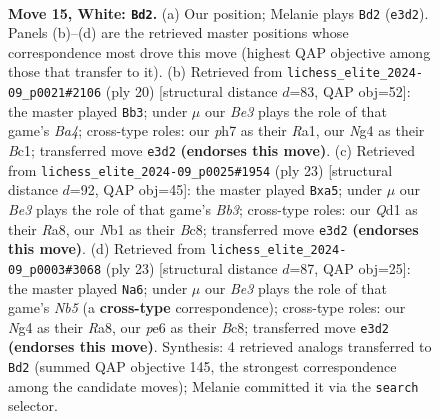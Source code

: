 \documentclass[11pt]{article}
\begin{document}
\clearpage

\begin{figure}[p]\centering
\begin{subfigure}{0.46\textwidth}\centering
\resizebox{\linewidth}{!}{%
\newchessgame
\chessboard[
  setfen={rnbr2k1/1p2bppp/pn1qp3/8/2pp2N1/1P2B1P1/P3PPBP/RN1QRK2 w - - 0 15},
  showmover=false,
  pgfstyle=straightmove, color=movearrow, markmove={e3-d2}
]}
\caption{}
\end{subfigure}\hfill
\begin{subfigure}{0.46\textwidth}\centering
\resizebox{\linewidth}{!}{%
\newchessgame
\chessboard[
  setfen={r1bqrbk1/2pp1pp1/p1n2n1p/1p2p3/B3P3/2PP1NN1/PP3PPP/R1BQ1RK1 w - - 0 11},
  showmover=false,
  pgfstyle=straightmove, color=movearrow, markmove={a4-b3}
]}
\caption{}
\end{subfigure}
\\[4pt]
\begin{subfigure}{0.46\textwidth}\centering
\resizebox{\linewidth}{!}{%
\newchessgame
\chessboard[
  setfen={r1bq1rk1/1p3ppp/1bpp1nn1/P3p3/4P3/1BPP1N2/P4PPP/R1BQRNK1 b - - 0 12},
  showmover=false,
  pgfstyle=straightmove, color=movearrow, markmove={b6-a5}
]}
\caption{}
\end{subfigure}\hfill
\begin{subfigure}{0.46\textwidth}\centering
\resizebox{\linewidth}{!}{%
\newchessgame
\chessboard[
  setfen={r1bq1rk1/2ppnpbp/6p1/pp1P4/1n2P3/PB3N2/1P3PPP/RNBQ1RK1 b - - 0 12},
  showmover=false,
  pgfstyle=straightmove, color=movearrow, markmove={b4-a6}
]}
\caption{}
\end{subfigure}
\caption{\textbf{Move 15, White: \texttt{Bd2}.} (a) Our position; Melanie plays \texttt{Bd2} (\texttt{e3d2}). Panels (b)--(d) are the retrieved master positions whose correspondence most drove this move (highest QAP objective among those that transfer to it). (b) Retrieved from \texttt{lichess\_elite\_2024-09\_p0021\#2106} (ply 20) [structural distance $d$=83, QAP obj=52]: the master played \texttt{Bb3}; under $\mu$ our \emph{Be3} plays the role of that game's \emph{Ba4}; cross-type roles: our \emph{p}h7 as their \emph{R}a1, our \emph{N}g4 as their \emph{B}c1; transferred move \texttt{e3d2} \textbf{(endorses this move)}. (c) Retrieved from \texttt{lichess\_elite\_2024-09\_p0025\#1954} (ply 23) [structural distance $d$=92, QAP obj=45]: the master played \texttt{Bxa5}; under $\mu$ our \emph{Be3} plays the role of that game's \emph{Bb3}; cross-type roles: our \emph{Q}d1 as their \emph{R}a8, our \emph{N}b1 as their \emph{B}c8; transferred move \texttt{e3d2} \textbf{(endorses this move)}. (d) Retrieved from \texttt{lichess\_elite\_2024-09\_p0003\#3068} (ply 23) [structural distance $d$=87, QAP obj=25]: the master played \texttt{Na6}; under $\mu$ our \emph{Be3} plays the role of that game's \emph{Nb5} (a \textbf{cross-type} correspondence); cross-type roles: our \emph{N}g4 as their \emph{R}a8, our \emph{p}e6 as their \emph{B}c8; transferred move \texttt{e3d2} \textbf{(endorses this move)}. Synthesis: 4 retrieved analogs transferred to \texttt{Bd2} (summed QAP objective 145, the strongest correspondence among the candidate moves); Melanie committed it via the \texttt{search} selector.}
\label{fig:thought-m28}
\end{figure}
\end{document}
